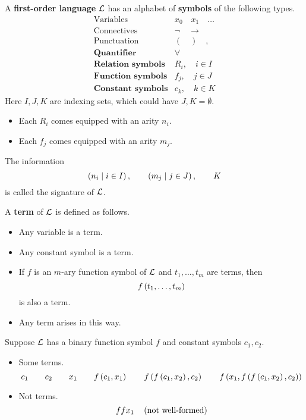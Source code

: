 \begin{definition}
\label{def:2.2.1}
A \textbf{first-order language} $ \mathcal{L} $ has an alphabet of \textbf{symbols} of the following types.
$$
\begin{array}{ll}
\text{Variables} & x_0 \quad x_1 \quad \dots \\
\text{Connectives} & \neg \quad \rightarrow \\
\text{Punctuation} & ( \quad ) \quad , \\
\textbf{Quantifier} & \forall \\
\textbf{Relation symbols} & R_i, \quad i \in I \\
\textbf{Function symbols} & f_j, \quad j \in J \\
\textbf{Constant symbols} & c_k, \quad k \in K
\end{array}
$$
Here $ I, J, K $ are indexing sets, which could have $ J, K = \emptyset $.
\begin{itemize}
\item Each $ R_i $ comes equipped with an arity $ n_i $.
\item Each $ f_j $ comes equipped with an arity $ m_j $.
\end{itemize}
The information
$$ \left( n_i \mid i \in I \right), \qquad \left( m_j \mid j \in J \right), \qquad K $$
is called the signature of $ \mathcal{L} $.
\end{definition}

\pagebreak

\begin{definition}
A \textbf{term} of $ \mathcal{L} $ is defined as follows.
\begin{itemize}
\item Any variable is a term.
\item Any constant symbol is a term.
\item If $ f $ is an $ m $-ary function symbol of $ \mathcal{L} $ and $ t_1, \dots, t_m $ are terms, then
$$ f\left( t_1, \dots, t_m \right) $$
is also a term.
\item Any term arises in this way.
\end{itemize}
\end{definition}

\begin{example*}
Suppose $ \mathcal{L} $ has a binary function symbol $ f $ and constant symbols $ c_1, c_2 $.
\begin{itemize}
\item Some terms.
$$ c_1 \qquad c_2 \qquad x_1 \qquad f\left( c_1, x_1 \right) \qquad f\left( f\left( c_1, x_2 \right), c_2 \right) \qquad f\left( x_1, f\left( f\left( c_1, x_2 \right), c_2 \right) \right) $$
\item Not terms.
$$ ffx_1 \quad \left( \text{not well-formed} \right) $$
\end{itemize}
\end{example*}

